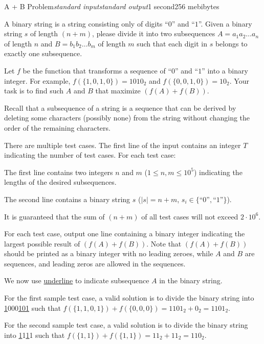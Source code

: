 \begin{problem}{A + B Problem}{\textsl{standard input}}{\textsl{standard output}}{1 second}{256 mebibytes}

A binary string is a string consisting only of digits ``$0$'' and ``$1$''. Given a binary string $s$ of length $(n + m)$, please divide it into two subsequences $A = a_1 a_2 \ldots a_n$ of length $n$ and $B = b_1 b_2 \ldots b_m$ of length $m$ such that each digit in $s$ belongs to exactly one subsequence.

Let $f$ be the function that transforms a sequence of ``$0$'' and ``$1$'' into a binary integer. For example, $f(\{1, 0, 1, 0\}) = 1010_2$ and $f(\{0, 0, 1, 0\}) = 10_2$. Your task is to find such $A$ and $B$ that maximize $(f(A) + f(B))$.

Recall that a subsequence of a string is a sequence that can be derived by deleting some characters (possibly none) from the string without changing the order of the remaining characters.

\InputFile
There are multiple test cases. The first line of the input contains an integer $T$ indicating the number of test cases. For each test case:

The first line contains two integers $n$ and $m$ ($1 \le n, m \le 10^5$) indicating the lengths of the desired subsequences.

The second line contains a binary string $s$ ($|s| = n + m$, $s_i \in \{\text{``$0$''}, \text{``$1$''}\}$).

It is guaranteed that the sum of $(n + m)$ of all test cases will not exceed $2 \cdot 10^6$.


\OutputFile
For each test case, output one line containing a binary integer indicating the largest possible result of $(f(A) + f(B))$. Note that $(f(A) + f(B))$ should be printed as a binary integer with no leading zeroes, while $A$ and $B$ are sequences, and leading zeros are allowed in the sequences.




\Example

\begin{example}
%
\end{example}

\Note
We now use \underline{underline} to indicate subsequence $A$ in the binary string.

For the first sample test case, a valid solution is to divide the binary string into \underline{1}000\underline{101} such that $f(\{1, 1, 0, 1\}) + f(\{0, 0, 0\}) = 1101_2 + 0_2 = 1101_2$.

For the second sample test case, a valid solution is to divide the binary string into \underline{1}1\underline{1}1 such that $f(\{1, 1\}) + f(\{1, 1\}) = 11_2 + 11_2 = 110_2$.

\end{problem}
